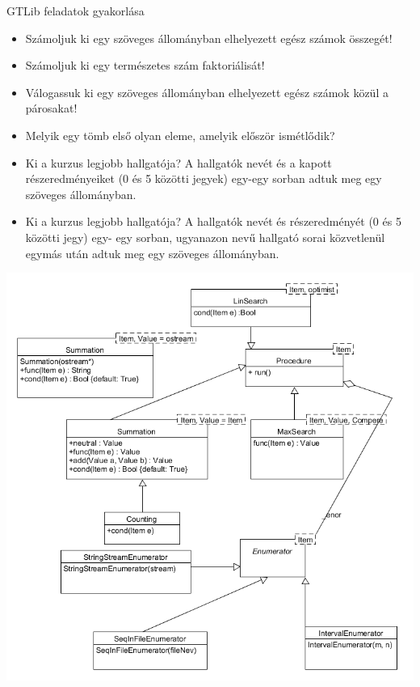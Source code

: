 \documentclass[12pt,a4paper]{article}
\begin{document}
GTLib feladatok gyakorlása

\begin{itemize}

\item Számoljuk ki egy szöveges állományban elhelyezett egész számok összegét!
\item Számoljuk ki egy természetes szám faktoriálisát!
\item Válogassuk ki egy szöveges állományban elhelyezett egész számok közül a párosakat!
\item Melyik egy tömb első olyan eleme, amelyik először ismétlődik?
\item Ki a kurzus legjobb hallgatója? A hallgatók nevét és a kapott részeredményeiket (0 és 5
közötti jegyek) egy-egy sorban adtuk meg egy szöveges állományban.
\item Ki a kurzus legjobb hallgatója? A hallgatók nevét és részeredményét (0 és 5 közötti jegy) egy-
egy sorban, ugyanazon nevű hallgató sorai közvetlenül egymás után adtuk meg egy szöveges
állományban.

\end{itemize}

\includegraphics[scale=0.6]{gtlib_uml.png}
\end{document}
